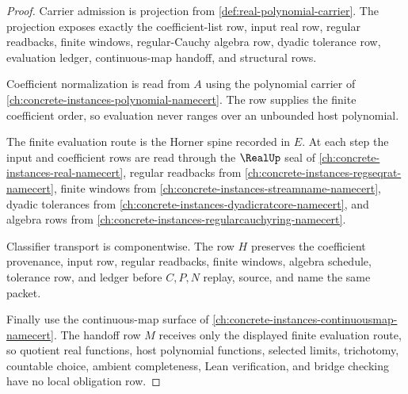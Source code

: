\begin{proof}
Carrier admission is projection from \autoref{def:real-polynomial-carrier}. The projection exposes exactly the coefficient-list row, input real row, regular readbacks, finite windows, regular-Cauchy algebra row, dyadic tolerance row, evaluation ledger, continuous-map handoff, and structural rows.

Coefficient normalization is read from $A$ using the polynomial carrier of \autoref{ch:concrete-instances-polynomial-namecert}. The row supplies the finite coefficient order, so evaluation never ranges over an unbounded host polynomial.

The finite evaluation route is the Horner spine recorded in $E$. At each step the input and coefficient rows are read through the $\RealUp$ seal of \autoref{ch:concrete-instances-real-namecert}, regular readbacks from \autoref{ch:concrete-instances-regseqrat-namecert}, finite windows from \autoref{ch:concrete-instances-streamname-namecert}, dyadic tolerances from \autoref{ch:concrete-instances-dyadicratcore-namecert}, and algebra rows from \autoref{ch:concrete-instances-regularcauchyring-namecert}.

Classifier transport is componentwise. The row $H$ preserves the coefficient provenance, input row, regular readbacks, finite windows, algebra schedule, tolerance row, and ledger before $C,P,N$ replay, source, and name the same packet.

Finally use the continuous-map surface of \autoref{ch:concrete-instances-continuousmap-namecert}. The handoff row $M$ receives only the displayed finite evaluation route, so quotient real functions, host polynomial functions, selected limits, trichotomy, countable choice, ambient completeness, Lean verification, and bridge checking have no local obligation row.
\end{proof}


